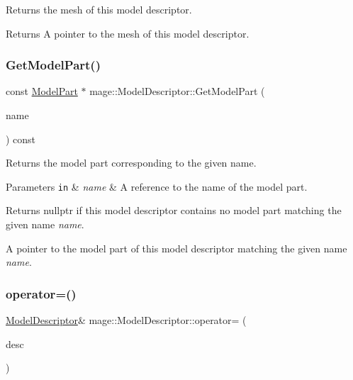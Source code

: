 Returns the mesh of this model descriptor.

\begin{DoxyReturn}{Returns}
A pointer to the mesh of this model descriptor. 
\end{DoxyReturn}
\hypertarget{classmage_1_1_model_descriptor_af0913a998ec50055e3079c2b4ad6ad2e}{}\label{classmage_1_1_model_descriptor_af0913a998ec50055e3079c2b4ad6ad2e} 
\subsubsection{\texorpdfstring{Get\+Model\+Part()}{GetModelPart()}}
{\footnotesize\ttfamily const \hyperlink{structmage_1_1_model_part}{Model\+Part} $\ast$ mage\+::\+Model\+Descriptor\+::\+Get\+Model\+Part (\begin{DoxyParamCaption}\item[{const string \&}]{name }\end{DoxyParamCaption}) const}

Returns the model part corresponding to the given name.


\begin{DoxyParams}[1]{Parameters}
\mbox{\tt in}  & {\em name} & A reference to the name of the model part. \\
\hline
\end{DoxyParams}
\begin{DoxyReturn}{Returns}
{\ttfamily nullptr} if this model descriptor contains no model part matching the given name {\itshape name}. 

A pointer to the model part of this model descriptor matching the given name {\itshape name}. 
\end{DoxyReturn}
\hypertarget{classmage_1_1_model_descriptor_a734b17224719896921e9f6252ee88483}{}\label{classmage_1_1_model_descriptor_a734b17224719896921e9f6252ee88483} 
\subsubsection{\texorpdfstring{operator=()}{operator=()}\hspace{0.1cm}{\footnotesize\ttfamily [1/2]}}
{\footnotesize\ttfamily \hyperlink{classmage_1_1_model_descriptor}{Model\+Descriptor}\& mage\+::\+Model\+Descriptor\+::operator= (\begin{DoxyParamCaption}\item[{const \hyperlink{classmage_1_1_model_descriptor}{Model\+Descriptor} \&}]{desc }\end{DoxyParamCaption})\hspace{0.3cm}{\ttfamily [delete]}}

